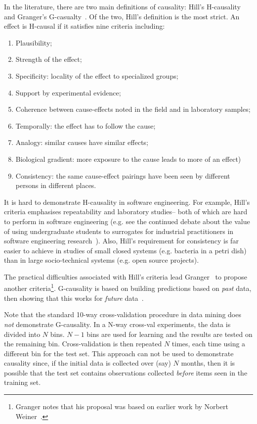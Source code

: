 \documentclass[conference]{IEEEtran}
\newcommand{\be}{\begin{enumerate}}
\newcommand{\ee}{\end{enumerate}}
\begin{document}
In the literature, there are two main definitions of causality: Hill's H-causality~\cite{Hill1965}
and Granger's G-casualty~\cite{granger80}. 
Of the two, Hill's definition is the most strict. An effect
is H-causal if it satisfies nine criteria including:
\be
\item
Plausibility;
\item
Strength of the effect; 
\item
Specificity: locality of the effect
to specialized groups;
\item
Support by experimental evidence;
\item
Coherence between cause-effects noted
in the field and in laboratory samples;
\item
Temporally: the effect has to follow the cause;
\item
Analogy: similar causes have similar effects;
\item
Biological gradient: more exposure to the cause leads to more of an
effect)
\item
Consistency: the same cause-effect pairings have been seen by different persons
in different places.
\ee
It is hard to demonstrate H-causality in software engineering.
For example, Hill's criteria emphasises repeatability and laboratory studies-- both of which are
hard to perform in software engineering (e.g. see the continued debate about
the value of using undergraduate students to surrogates for industrial
practitioners in software engineering research~\cite{Carver2003}). Also, Hill's requirement
for consistency is far easier to achieve in studies of small closed systems (e.g. bacteria in a petri dish)
than in large socio-technical systems (e.g. open source projects). 

The practical difficulties associated with Hill's criteria lead Granger~\cite{granger80}
to propose another criteria\footnote{Granger  notes that
his proposal was based on earlier work by Norbert Weiner~\cite{Seth2007}.}.
G-causality is based on building predictions based on {\em past} data,
then showing that this works for {\em future} data~\cite{granger80}. 

Note that the standard 10-way cross-validation
procedure  in data mining does {\em not} demonstrate G-causality.  In a N-way cross-val experiments, the data is divided into $N$ bins.  
$N-1$ bins are used for learning and the results are tested
on the  remaining bin.
Cross-validation is then repeated $N$ times, each time using a different bin for the test set.
This approach can not be used to demonstrate causality since, if the initial data is collected
over (say) $N$ months, then it is possible that the test set contains observations collected
{\em before}   items seen in the training set. 
\end{document}
